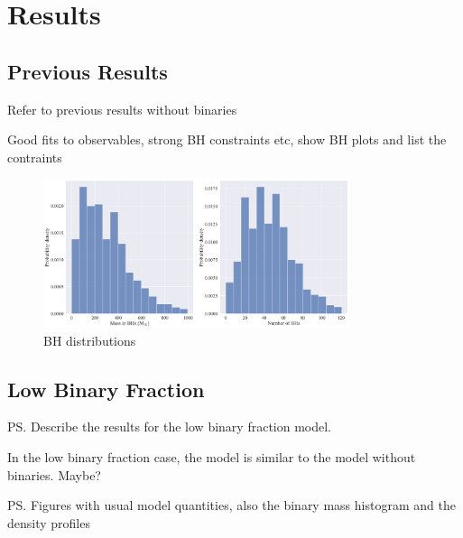 


\section{Results}



\subsection{Previous Results}
Refer to previous results without binaries

Good fits to observables, strong BH constraints etc, show BH plots and list the contraints

\begin{figure}
	\centering
	\includegraphics[width=0.8\textwidth]{figures/prev_nobin/BH_dists.png}
	\caption{BH distributions}
	\label{fig:prev_nobin_BH_dists}
\end{figure}


\subsection{Low Binary Fraction}
\ps{Describe the results for the low binary fraction model.}

In the low binary fraction case, the model is similar to the model without binaries. Maybe?

\ps{Figures with usual model quantities, also the binary mass histogram and the density profiles}


